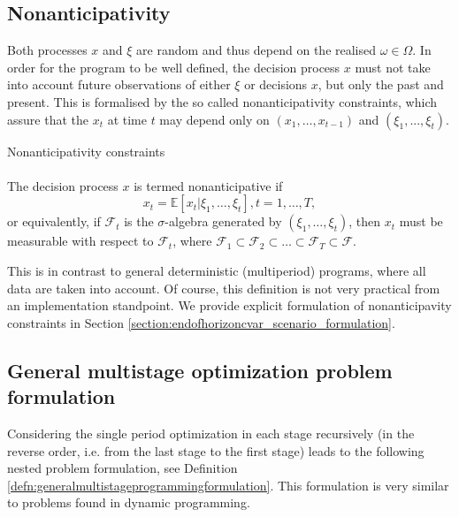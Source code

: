 \subsection{Nonanticipativity}
Both processes $x$ and $\xi$ are random and thus depend on the realised $\omega \in \Omega$. In order for the program to be well defined, the decision process $x$ must not take into account future observations of either
$\xi$ or decisions $x$, but only the past and present. This is formalised by the so called nonanticipativity constraints, which assure that the $x_t$ at time $t$ may depend only on $(x_1,\dots,x_{t-1})$ and $(\xi_1,...,\xi_{t})$.

\begin{defn}{Nonanticipativity constraints} \label{def:nonanticipativity constraints}
\\
\cite[Ch. 1, Section 3.3., P. 35]{stochasticprogrammingbible} \\
The decision process $x$ is termed nonanticipative if
\begin{equation*}
x_t=\mathbb{E}\left[x_t|\xi_1,\dots,\xi_t \right], t=1,\dots,T,
\end{equation*}
or equivalently, if $\mathcal{F}_t$ is the $\sigma$-algebra generated by $(\xi_1,\dots,\xi_t)$, then $x_t$ must be measurable with respect to $\mathcal{F}_t$, where $\mathcal{F}_1 \subset \mathcal{F}_2 \subset \dots \subset \mathcal{F}_T \subset \mathcal{F}$.
\end{defn}
This is in contrast to general deterministic (multiperiod) programs, where all data are taken into account. Of course, this definition is not very practical from an implementation standpoint. We provide explicit formulation of nonanticipavity constraints in Section \ref{section:endofhorizoncvar_scenario_formulation}.

\subsection{General multistage optimization problem formulation}
Considering the single period optimization in each stage recursively (in the reverse order,  i.e. from the last stage to the first stage) leads to the following nested problem formulation, see Definition \ref{defn:generalmultistageprogrammingformulation}. This formulation is very similar to problems found in dynamic programming.

